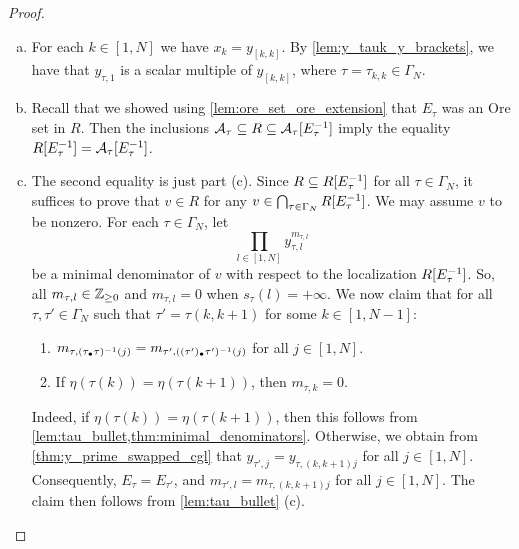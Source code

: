 {\begin{proof}
\begin{enumerate}[(a)]
\begin{equation*}
			      x_{\tau(k)} = y_{\tau, p_\tau(k)}\inv (y_{\tau, k} + c_{\tau, k}) \in \mcA_\tau[E\inv_\tau],
		      \end{equation*}
		      because $y_{\tau, p_\tau(k)} \in E_\tau$ as $s_\tau(p_\tau(k)) = k \neq +\infty$.
		\item For each $k \in [1, N]$ we have $x_k = y_{[k , k]}$. By \cref{lem:y_tauk_y_brackets},
		      we have that $y_{\tau, 1}$ is a scalar multiple of $y_{[k,k]}$, where $\tau =
			      \tau_{k,k} \in \Gamma_N$.
		\item Recall that we showed using \cref{lem:ore_set_ore_extension} that $E_\tau$ was an Ore
		      set in $R$. Then the inclusions $\mathcal{A}_\tau \subseteq R \subseteq \mathcal{A}_\tau[E^{-1}_\tau]$
		      imply the equality $R[E^{-1}_\tau] = \mathcal{A}_\tau[E^{-1}_\tau]$.
		\item The second equality is just part (c). Since $R \subseteq R[E^{-1}_\tau]$ for all $\tau
			      \in \Gamma_N$, it suffices to prove that $v\in R$ for any $v \in \bigcap_{\tau\in
				      \Gamma_N} R[E^{-1}_\tau]$. We may assume $v$ to be nonzero. For each $\tau \in
			      \Gamma_N$, let
		      \begin{equation*}
			      \prod_{l \in [1, N]}y_{\tau, l}^{m_{\tau, l}}
		      \end{equation*}
		      be a minimal denominator of $v$ with respect to the localization $R[E^{-1}_\tau]$. So,
		      all $m_{\tau, l} \in \mathbb{Z}_{\geq 0}$ and $m_{\tau, l} = 0$ when $s_\tau(l) = + \infty$.
		      We now claim that for all $\tau, \tau' \in \Gamma_N$ such that $\tau' = \tau(k, k+1)$
		      for some $k \in [1, N- 1]$:
		      \begin{enumerate}
			      \item $m_{\tau, (\tau_\bullet\tau)^{-1}(j)} = m_{\tau', ((\tau')_\bullet\tau')^{-1}(j)}$ for all $j \in [1, N]$.
			      \item If $\eta(\tau(k)) = \eta(\tau(k+1))$, then $m_{\tau, k} = 0$.
		      \end{enumerate}
		      Indeed, if $\eta(\tau(k)) = \eta(\tau(k + 1))$, then this follows from
		      \cref{lem:tau_bullet,thm:minimal_denominators}. Otherwise, we obtain from
		      \cref{thm:y_prime_swapped_cgl} that $y_{\tau', j} = y_{\tau, (k, k+1)j}$ for all $j\in
			      [1, N]$. Consequently, $E_\tau = E_{\tau'}$, and $m_{\tau', l} = m_{\tau, (k, k+1)j}$
		      for all $j \in [1, N]$. The claim then follows from \cref{lem:tau_bullet} (c).


\end{enumerate}
\end{proof}}

